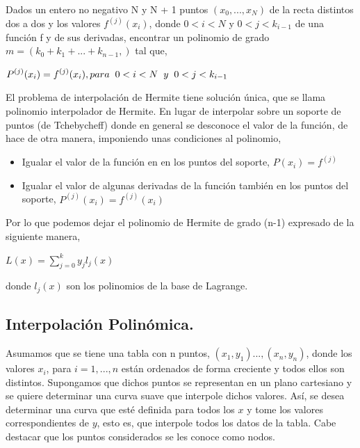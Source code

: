 \hspace{0.4cm} Dados un entero no negativo N y  N + 1 puntos $(x_{0},..., x_{N})$ de la recta distintos dos a dos y los valores $f^{(j)} (x_{i})$, donde $0<i<N$ y $0<j<k_{i-1}$ de una funci\'on f y de sus derivadas, encontrar un polinomio de grado $m = (k_{0} +k_{1} +...+k_{n-1},)$ tal que,

\begin{center}
$\displaystyle{P^{(j)} (x_{i}) = f^{(j)} (x_{i}), para \hspace{0.2cm} 0<i<N \hspace{0.2cm}y \hspace{0.2cm} 0<j<k_{i-1}}$
\end{center}

\hspace{0.4cm} El problema de interpolaci\'on de Hermite tiene soluci\'on \'unica, que se llama polinomio interpolador de Hermite. En lugar de interpolar sobre un soporte de puntos (de Tchebycheff) donde en general se desconoce el valor de la funci\'on, de hace de otra manera, imponiendo unas condiciones al polinomio,

\begin{itemize}
  \item  Igualar el valor de la funci\'on en en los puntos del soporte, $P (x_{i}) = f^{(j)}$
  \item Igualar el valor de algunas derivadas de la funci\'on tambi\'en en los puntos del soporte, $P^{(j)} (x_{i}) = f^{(j)} (x_{i})$
\end{itemize}

\hspace{0.4cm} Por lo que podemos dejar el polinomio de Hermite de grado (n-1) expresado de la siguiente manera,

\begin{center}
$\displaystyle{L(x) = \sum_{j=0}^{k} y_{j} l_{j} (x) }$
\end{center}

\noindent donde $l_{j}(x)$ son los polinomios de la base de Lagrange.


\subsection{Interpolaci\'on Polin\'omica.\\}

\hspace{0.4cm}Asumamos que se tiene una tabla con n puntos, $(x_{1},y_{1})...,(x_{n},y_{n})$, donde los valores $x_{i}$, para $i=1,...,n$ est\'an ordenados de forma creciente y todos ellos son distintos. Supongamos que dichos puntos se representan en un plano cartesiano y se quiere determinar una curva suave que interpole dichos valores. As\'i, se desea determinar una curva que est\'e definida para todos los $x$ y tome los valores correspondientes de $y$, esto es, que interpole todos los datos de la tabla. Cabe destacar que los puntos considerados se les conoce como nodos.


